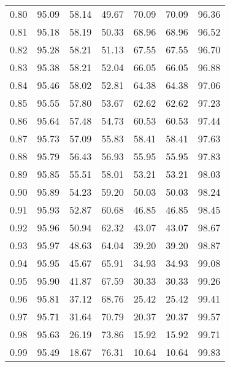 \begin{tabular}{|c|c|c|c|c|c|c|}
      0.80 &     95.09 &     58.14 &      49.67 &   70.09 &      70.09 &         96.36 \\
      0.81 &     95.18 &     58.19 &      50.33 &   68.96 &      68.96 &         96.52 \\
      0.82 &     95.28 &     58.21 &      51.13 &   67.55 &      67.55 &         96.70 \\
      0.83 &     95.38 &     58.21 &      52.04 &   66.05 &      66.05 &         96.88 \\
      0.84 &     95.46 &     58.02 &      52.81 &   64.38 &      64.38 &         97.06 \\
      0.85 &     95.55 &     57.80 &      53.67 &   62.62 &      62.62 &         97.23 \\
      0.86 &     95.64 &     57.48 &      54.73 &   60.53 &      60.53 &         97.44 \\
      0.87 &     95.73 &     57.09 &      55.83 &   58.41 &      58.41 &         97.63 \\
      0.88 &     95.79 &     56.43 &      56.93 &   55.95 &      55.95 &         97.83 \\
      0.89 &     95.85 &     55.51 &      58.01 &   53.21 &      53.21 &         98.03 \\
      0.90 &     95.89 &     54.23 &      59.20 &   50.03 &      50.03 &         98.24 \\
      0.91 &     95.93 &     52.87 &      60.68 &   46.85 &      46.85 &         98.45 \\
      0.92 &     95.96 &     50.94 &      62.32 &   43.07 &      43.07 &         98.67 \\
      0.93 &     95.97 &     48.63 &      64.04 &   39.20 &      39.20 &         98.87 \\
      0.94 &     95.95 &     45.67 &      65.91 &   34.93 &      34.93 &         99.08 \\
      0.95 &     95.90 &     41.87 &      67.59 &   30.33 &      30.33 &         99.26 \\
      0.96 &     95.81 &     37.12 &      68.76 &   25.42 &      25.42 &         99.41 \\
      0.97 &     95.71 &     31.64 &      70.79 &   20.37 &      20.37 &         99.57 \\
      0.98 &     95.63 &     26.19 &      73.86 &   15.92 &      15.92 &         99.71 \\
      0.99 &     95.49 &     18.67 &      76.31 &   10.64 &      10.64 &         99.83 \\
\bottomrule
\end{tabular}
